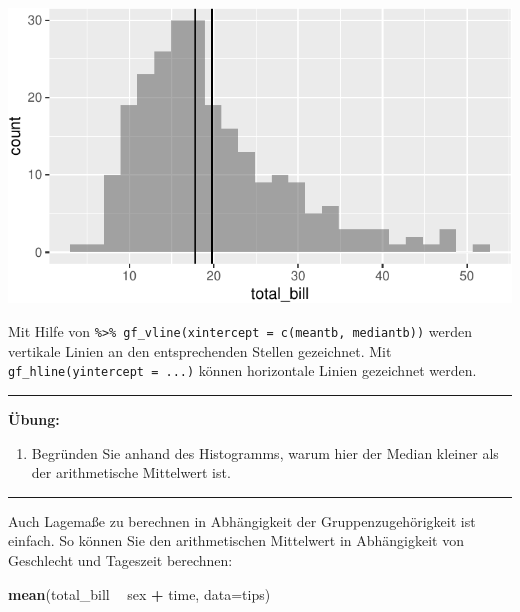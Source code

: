 \documentclass[12pt,ngerman,paper=a4,pagesize,DIV=13]{scrreprt}
\newenvironment{Shaded}{\begin{snugshade}}{\end{snugshade}}
\newcommand{\DataTypeTok}[1]{\textcolor[rgb]{0.13,0.29,0.53}{#1}}
\newcommand{\KeywordTok}[1]{\textcolor[rgb]{0.13,0.29,0.53}{\textbf{#1}}}
\newcommand{\NormalTok}[1]{#1}
\newcommand{\OperatorTok}[1]{\textcolor[rgb]{0.81,0.36,0.00}{\textbf{#1}}}
\newcommand{\StringTok}[1]{\textcolor[rgb]{0.31,0.60,0.02}{#1}}
\providecommand{\tightlist}{%
  \setlength{\itemsep}{0pt}\setlength{\parskip}{0pt}}
\begin{document}
\includegraphics{DatenerhebungStatistik-Uebung_files/figure-latex/unnamed-chunk-61-1.pdf}

Mit Hilfe von
\texttt{\%\textgreater{}\%\ gf\_vline(xintercept\ =\ c(meantb,\ mediantb))}
werden vertikale Linien an den entsprechenden Stellen gezeichnet. Mit
\texttt{gf\_hline(yintercept\ =\ ...)} können horizontale Linien
gezeichnet werden.

\begin{center}\rule{0.5\linewidth}{\linethickness}\end{center}

\textbf{Übung:}

\begin{enumerate}
\def\labelenumi{\arabic{enumi}.}
\setcounter{enumi}{5}
\tightlist
\item
  Begründen Sie anhand des Histogramms, warum hier der Median kleiner
  als der arithmetische Mittelwert ist.
\end{enumerate}

\begin{center}\rule{0.5\linewidth}{\linethickness}\end{center}

Auch Lagemaße zu berechnen in Abhängigkeit der Gruppenzugehörigkeit ist
einfach. So können Sie den arithmetischen Mittelwert in Abhängigkeit von
Geschlecht und Tageszeit berechnen:

\begin{Shaded}
\begin{Highlighting}[]
\KeywordTok{mean}\NormalTok{(total_bill }\OperatorTok{~}\StringTok{ }\NormalTok{sex }\OperatorTok{+}\StringTok{ }\NormalTok{time, }\DataTypeTok{data=}\NormalTok{tips)}
\end{Highlighting}
\end{Shaded}
\end{document}
